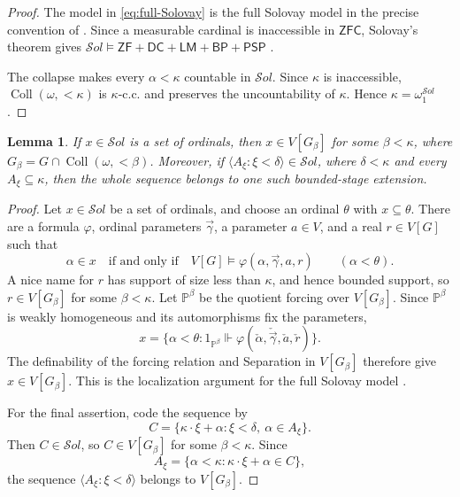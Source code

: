 \documentclass[11pt,a4paper]{amsart}
\newcommand{\ZF}{\mathsf{ZF}}
\newcommand{\ZFC}{\mathsf{ZFC}}
\newcommand{\Coll}{\operatorname{Coll}}
\newcommand{\DC}{\mathsf{DC}}
\newcommand{\LM}{\mathsf{LM}}
\newcommand{\BP}{\mathsf{BP}}
\newcommand{\PSP}{\mathsf{PSP}}
\theoremstyle{plain}
\newtheorem{lemma}[theorem]{Lemma}
\theoremstyle{definition}
\theoremstyle{remark}
\begin{document}
\begin{proof}
The model in \eqref{eq:full-Solovay} is the full Solovay model in the precise convention of \cite[Definition~4 and the following paragraph]{SakaiTanno}.  Since a measurable cardinal is inaccessible in $\ZFC$, Solovay's theorem gives
$\mathcal S\!ol\models\ZF+\DC+\LM+\BP+\PSP$ \cite[Theorem~1]{Solovay}.

The collapse makes every $\alpha<\kappa$ countable in $\mathcal S\!ol$.  Since $\kappa$ is inaccessible, ${\Coll}(\omega,{<}\kappa)$ is $\kappa$-c.c. and preserves the uncountability of $\kappa$.  Hence $\kappa=\omega_1^{\mathcal S\!ol}$.
\end{proof}

\begin{lemma}\label{lem:Solovay-localization}
If $x\in\mathcal S\!ol$ is a set of ordinals, then
$x\in V[G_\beta]$ for some $\beta<\kappa$, where
$G_\beta=G\cap{\Coll}(\omega,{<}\beta)$.  Moreover, if
$\langle A_\xi:\xi<\delta\rangle\in\mathcal S\!ol$, where
$\delta<\kappa$ and every $A_\xi\subseteq\kappa$, then the whole sequence belongs to one such bounded-stage extension.
\end{lemma}

\begin{proof}
Let $x\in\mathcal S\!ol$ be a set of ordinals, and choose an ordinal $\theta$ with $x\subseteq\theta$.  There are a formula $\varphi$, ordinal parameters $\vec\gamma$, a parameter $a\in V$, and a real $r\in V[G]$ such that
\[
\alpha\in x\quad\text{if and only if}\quad
V[G]\models\varphi(\alpha,\vec\gamma,a,r)
\qquad(\alpha<\theta).
\]
A nice name for $r$ has support of size less than $\kappa$, and hence bounded support, so $r\in V[G_\beta]$ for some $\beta<\kappa$.  Let $\mathbb P^\beta$ be the quotient forcing over $V[G_\beta]$.  Since $\mathbb P^\beta$ is weakly homogeneous and its automorphisms fix the parameters,
\[
x=\{\alpha<\theta:
1_{\mathbb P^\beta}\Vdash
\varphi(\check\alpha,\check{\vec\gamma},\check a,\check r)\}.
\]
The definability of the forcing relation and Separation in $V[G_\beta]$ therefore give $x\in V[G_\beta]$.  This is the localization argument for the full Solovay model \cite[Definition~4, Fact~5, and the paragraph following Fact~5]{SakaiTanno}.

For the final assertion, code the sequence by
\[
C=\{\kappa\cdot\xi+\alpha:\xi<\delta,\ \alpha\in A_\xi\}.
\]
Then $C\in\mathcal S\!ol$, so $C\in V[G_\beta]$ for some $\beta<\kappa$.  Since
\[
A_\xi=\{\alpha<\kappa:\kappa\cdot\xi+\alpha\in C\},
\]
the sequence $\langle A_\xi:\xi<\delta\rangle$ belongs to $V[G_\beta]$.
\end{proof}
\end{document}
